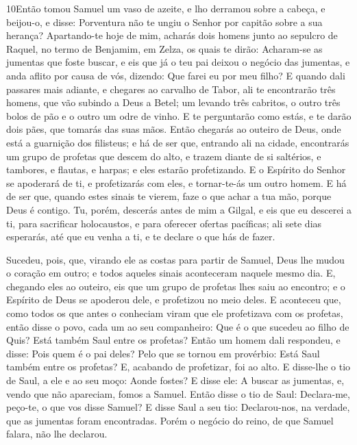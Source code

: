 \lettrine{10} Então tomou Samuel um vaso de azeite, e lho
derramou sobre a cabeça, e beijou-o, e disse: Porventura não te
ungiu o Senhor por capitão sobre a sua herança? Apartando-te
hoje de mim, acharás dois homens junto ao sepulcro de Raquel, no
termo de Benjamim, em Zelza, os quais te dirão: Acharam-se as
jumentas que foste buscar, e eis que já o teu pai deixou o negócio
das jumentas, e anda aflito por causa de vós, dizendo: Que farei eu
por meu filho? E quando dali passares mais adiante, e chegares
ao carvalho de Tabor, ali te encontrarão três homens, que vão
subindo a Deus a Betel; um levando três cabritos, o outro três bolos
de pão e o outro um odre de vinho. E te perguntarão como estás,
e te darão dois pães, que tomarás das suas mãos. Então chegarás
ao outeiro de Deus, onde está a guarnição dos filisteus; e há de ser
que, entrando ali na cidade, encontrarás um grupo de profetas que
descem do alto, e trazem diante de si saltérios, e tambores, e
flautas, e harpas; e eles estarão profetizando. E o Espírito do
Senhor se apoderará de ti, e profetizarás com eles, e tornar-te-ás
um outro homem. E há de ser que, quando estes sinais te vierem,
faze o que achar a tua mão, porque Deus é contigo. Tu, porém,
descerás antes de mim a Gilgal, e eis que eu descerei a ti, para
sacrificar holocaustos, e para oferecer ofertas pacíficas; ali sete
dias esperarás, até que eu venha a ti, e te declare o que hás de
fazer.

Sucedeu, pois, que, virando ele as costas para partir de Samuel,
Deus lhe mudou o coração em outro; e todos aqueles sinais
aconteceram naquele mesmo dia. E, chegando eles ao outeiro,
eis que um grupo de profetas lhes saiu ao encontro; e o Espírito de
Deus se apoderou dele, e profetizou no meio deles. E
aconteceu que, como todos os que antes o conheciam viram que ele
profetizava com os profetas, então disse o povo, cada um ao seu
companheiro: Que é o que sucedeu ao filho de Quis? Está também Saul
entre os profetas? Então um homem dali respondeu, e disse:
Pois quem é o pai deles? Pelo que se tornou em provérbio: Está Saul
também entre os profetas? E, acabando de profetizar, foi ao
alto. E disse-lhe o tio de Saul, a ele e ao seu moço: Aonde
fostes? E disse ele: A buscar as jumentas, e, vendo que não
apareciam, fomos a Samuel. Então disse o tio de Saul:
Declara-me, peço-te, o que vos disse Samuel? E disse Saul a
seu tio: Declarou-nos, na verdade, que as jumentas foram
encontradas. Porém o negócio do reino, de que Samuel falara, não lhe
declarou.

